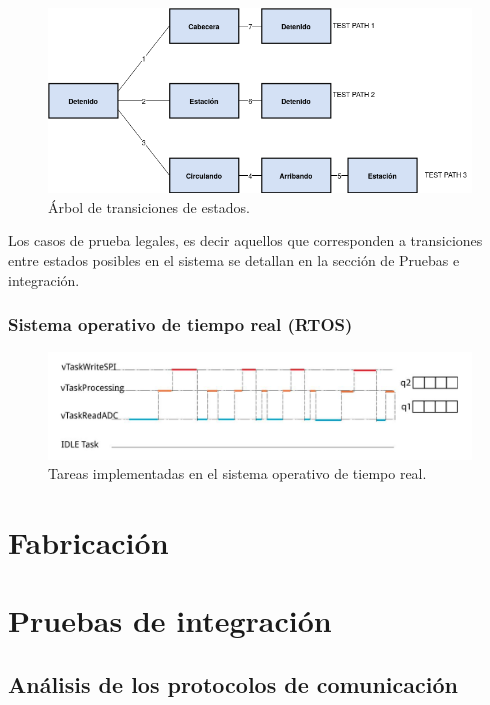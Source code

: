 \documentclass[
11pt, %
]{charter}
\begin{document}
\begin{figure}[htpb]
\centering 
\includegraphics[width=1\textwidth]{./Pics/STT.Tree.png}
\caption{Árbol de transiciones de estados.}
\label{fig:State tree}
\end{figure}

Los casos de prueba legales, es decir aquellos que corresponden a
transiciones entre estados posibles en el sistema se detallan en la sección de Pruebas e integración.





\pagebreak
\subsubsection{Sistema operativo de tiempo real (RTOS)}

\begin{figure}[htpb]
\centering 
\includegraphics[width=1\textwidth]{./Pics/RTOS.tasks.png}
\caption{Tareas implementadas en el sistema operativo de tiempo real.}
\label{fig:RTOS tasks}
\end{figure}

\pagebreak
\section{Fabricación}
\pagebreak
\section{Pruebas de integración}
\subsection{Análisis de los protocolos de comunicación}
\end{document}
